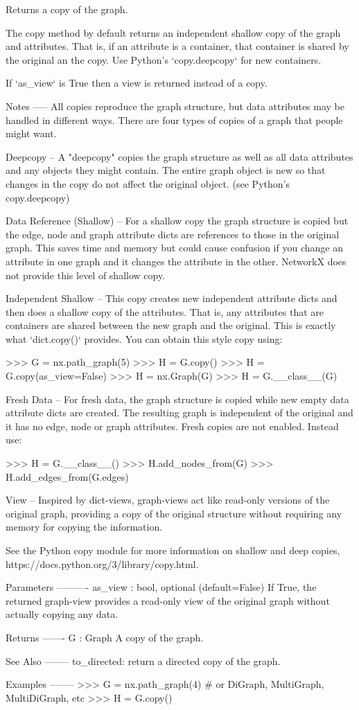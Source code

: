 \begin{DoxyVerb}Returns a copy of the graph.

The copy method by default returns an independent shallow copy
of the graph and attributes. That is, if an attribute is a
container, that container is shared by the original an the copy.
Use Python's `copy.deepcopy` for new containers.

If `as_view` is True then a view is returned instead of a copy.

Notes
-----
All copies reproduce the graph structure, but data attributes
may be handled in different ways. There are four types of copies
of a graph that people might want.

Deepcopy -- A "deepcopy" copies the graph structure as well as
all data attributes and any objects they might contain.
The entire graph object is new so that changes in the copy
do not affect the original object. (see Python's copy.deepcopy)

Data Reference (Shallow) -- For a shallow copy the graph structure
is copied but the edge, node and graph attribute dicts are
references to those in the original graph. This saves
time and memory but could cause confusion if you change an attribute
in one graph and it changes the attribute in the other.
NetworkX does not provide this level of shallow copy.

Independent Shallow -- This copy creates new independent attribute
dicts and then does a shallow copy of the attributes. That is, any
attributes that are containers are shared between the new graph
and the original. This is exactly what `dict.copy()` provides.
You can obtain this style copy using:

    >>> G = nx.path_graph(5)
    >>> H = G.copy()
    >>> H = G.copy(as_view=False)
    >>> H = nx.Graph(G)
    >>> H = G.__class__(G)

Fresh Data -- For fresh data, the graph structure is copied while
new empty data attribute dicts are created. The resulting graph
is independent of the original and it has no edge, node or graph
attributes. Fresh copies are not enabled. Instead use:

    >>> H = G.__class__()
    >>> H.add_nodes_from(G)
    >>> H.add_edges_from(G.edges)

View -- Inspired by dict-views, graph-views act like read-only
versions of the original graph, providing a copy of the original
structure without requiring any memory for copying the information.

See the Python copy module for more information on shallow
and deep copies, https://docs.python.org/3/library/copy.html.

Parameters
----------
as_view : bool, optional (default=False)
    If True, the returned graph-view provides a read-only view
    of the original graph without actually copying any data.

Returns
-------
G : Graph
    A copy of the graph.

See Also
--------
to_directed: return a directed copy of the graph.

Examples
--------
>>> G = nx.path_graph(4)  # or DiGraph, MultiGraph, MultiDiGraph, etc
>>> H = G.copy()\end{DoxyVerb}
